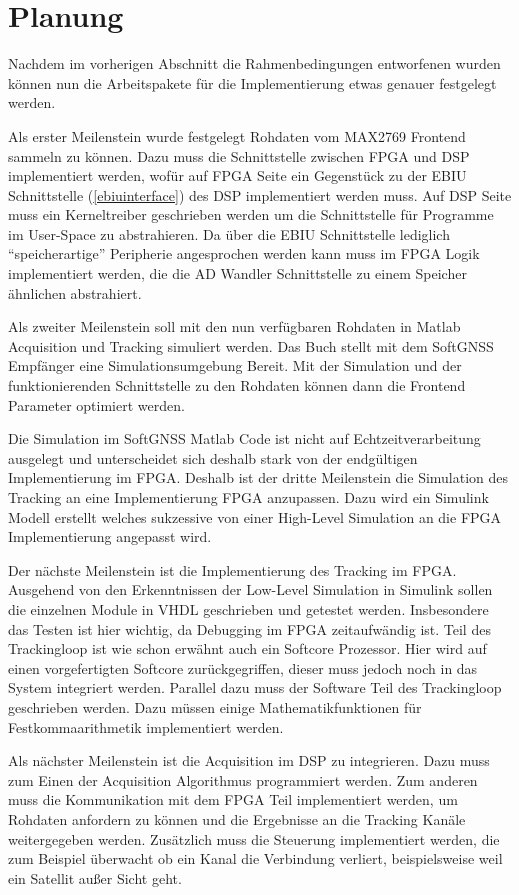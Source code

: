 \section{Planung}
Nachdem im vorherigen Abschnitt die Rahmenbedingungen  entworfenen  wurden können nun die Arbeitspakete für die Implementierung etwas genauer festgelegt werden. 

Als erster Meilenstein wurde festgelegt Rohdaten vom MAX2769 Frontend sammeln zu können. Dazu muss die Schnittstelle zwischen FPGA und DSP implementiert werden, wofür auf FPGA Seite ein Gegenstück zu der EBIU Schnittstelle (\ref{ebiuinterface}) des DSP implementiert werden muss. Auf DSP Seite muss ein Kerneltreiber geschrieben werden um die Schnittstelle für Programme im User-Space zu abstrahieren. Da über die EBIU Schnittstelle lediglich \enquote{speicherartige} Peripherie angesprochen werden kann muss im FPGA Logik implementiert werden, die die AD Wandler Schnittstelle zu einem Speicher ähnlichen abstrahiert.

Als zweiter Meilenstein soll mit den nun verfügbaren Rohdaten in Matlab Acquisition und Tracking simuliert werden. Das Buch \cite{borre2007software} stellt mit dem SoftGNSS Empfänger eine Simulationsumgebung Bereit. Mit der Simulation und der funktionierenden Schnittstelle zu den Rohdaten können dann die Frontend Parameter optimiert werden.

Die Simulation im SoftGNSS Matlab Code ist nicht auf Echtzeitverarbeitung ausgelegt und unterscheidet sich deshalb stark von der endgültigen Implementierung im FPGA. Deshalb ist der dritte Meilenstein die Simulation des Tracking an eine Implementierung FPGA anzupassen. Dazu wird ein Simulink Modell erstellt welches sukzessive von einer High-Level Simulation  an die FPGA Implementierung angepasst wird.

Der nächste Meilenstein ist die Implementierung des Tracking im FPGA. Ausgehend von den Erkenntnissen der Low-Level Simulation in Simulink sollen die einzelnen Module in VHDL geschrieben und getestet werden. Insbesondere das Testen ist hier wichtig, da Debugging im FPGA zeitaufwändig ist.
Teil des Trackingloop ist wie schon erwähnt auch ein Softcore Prozessor. Hier wird auf einen vorgefertigten Softcore zurückgegriffen, dieser muss jedoch noch in das System integriert werden. Parallel dazu muss der Software Teil des Trackingloop geschrieben werden. Dazu müssen einige Mathematikfunktionen für Festkommaarithmetik implementiert werden.

Als nächster Meilenstein ist die Acquisition im DSP zu integrieren. Dazu muss zum Einen der Acquisition Algorithmus programmiert werden. Zum anderen muss die Kommunikation mit dem FPGA Teil implementiert werden, um Rohdaten anfordern zu können und die Ergebnisse an die Tracking Kanäle weitergegeben werden. Zusätzlich muss die Steuerung implementiert werden, die zum Beispiel überwacht ob ein Kanal die Verbindung verliert, beispielsweise weil ein Satellit außer Sicht geht.

